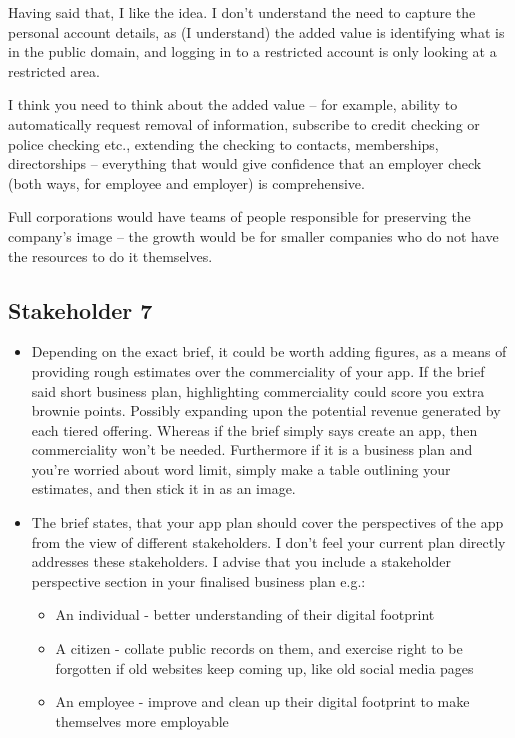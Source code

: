    Having said that, I like the idea.  I don't understand the need to capture the personal account details, as (I understand) the added value is identifying what is in the public domain, and logging in to a restricted account is only looking at a restricted area.

    I think you need to think about the added value – for example, ability to automatically request removal of information, subscribe to credit checking or police checking etc., extending the checking to contacts, memberships, directorships – everything that would give confidence that an employer check (both ways, for employee and employer) is comprehensive.

    Full corporations would have teams of people responsible for preserving the company's image – the growth would be for smaller companies who do not have the resources to do it themselves.

  \subsection{Stakeholder 7}

    \begin{itemize}
      \item Depending on the exact brief, it could be worth adding figures, as a means of providing rough estimates over the commerciality of your app. If the brief said short business plan, highlighting commerciality could score you extra brownie points. Possibly expanding upon the potential revenue generated by each tiered offering. Whereas if the brief simply says create an app, then commerciality won't be needed. Furthermore if it is a business plan and you're worried about word limit, simply make a table outlining your estimates, and then stick it in as an image.
      \item The brief states, that your app plan should cover the perspectives of the app from the view of different stakeholders. I don't feel your current plan directly addresses these stakeholders. I advise that you include a stakeholder perspective section in your finalised business plan e.g.:
      \begin{itemize}
        \item An individual - better understanding of their digital footprint
        \item A citizen - collate public records on them, and exercise right to be forgotten if old websites keep coming up, like old social media pages
        \item An employee - improve and clean up their digital footprint to make themselves more employable
      \end{itemize}
    \end{itemize}


